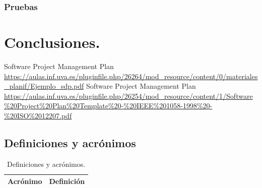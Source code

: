 \documentclass[a4paper,11pt, twoside]{article}
\begin{document}
\subsubsection{Pruebas}
\section{Conclusiones.}
\newpage
\renewcommand\refname{Bibliografía}
\begin{thebibliography}{99}
    Software Project Management Plan \url{https://aulas.inf.uva.es/pluginfile.php/26264/mod_resource/content/0/materiales_planif/Ejemplo_sdp.pdf}
    Software Project  
Management Plan \url{https://aulas.inf.uva.es/pluginfile.php/26254/mod_resource/content/1/Software\%20Project\%20Plan\%20Template\%20-\%20IEEE\%201058-1998\%20-\%20ISO\%2012207.pdf}
\end{thebibliography}

\newpage

\begin{appendices}
\addappheadtotoc
{}
\appendixpage

\renewcommand\thesubsection{Anexo \Roman{subsection}}

\subsection{Definiciones y acrónimos}\label{ANEXOI}
\begin{table}[!htbp]
        \centering
        \begin{tabular}{|c|c|}
        \hline
        \textbf{\large Acrónimo} & \textbf{\large Definición}\\
        \hline
        \end{tabular}
        \caption{Definiciones y acrónimos.}
        \label{ta:defyacr}
    \end{table}
\end{appendices}
\end{document}
